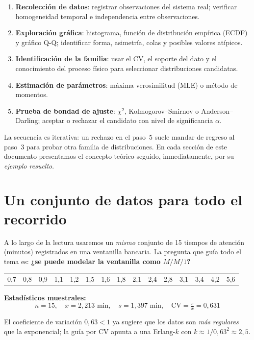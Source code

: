 \documentclass[11pt, letterpaper]{article}
\begin{document}
\begin{metodobox}
\begin{enumerate}
    \item \textbf{Recolección de datos}: registrar observaciones del sistema real; verificar homogeneidad temporal e independencia entre observaciones.
    \item \textbf{Exploración gráfica}: histograma, función de distribución empírica (ECDF) y gráfico Q-Q; identificar forma, asimetría, colas y posibles valores atípicos.
    \item \textbf{Identificación de la familia}: usar el CV, el soporte del dato y el conocimiento del proceso físico para seleccionar distribuciones candidatas.
    \item \textbf{Estimación de parámetros}: máxima verosimilitud (MLE) o método de momentos.
    \item \textbf{Prueba de bondad de ajuste}: $\chi^2$, Kolmogorov--Smirnov o Anderson--Darling; aceptar o rechazar el candidato con nivel de significancia $\alpha$.
\end{enumerate}
\end{metodobox}

La secuencia es iterativa: un rechazo en el paso~5 suele mandar de regreso al paso~3 para probar otra familia de distribuciones. En cada sección de este documento presentamos el concepto teórico seguido, inmediatamente, por su \emph{ejemplo resuelto}.

\section{Un conjunto de datos para todo el recorrido}

A lo largo de la lectura usaremos un \emph{mismo} conjunto de 15 tiempos de atención (minutos) registrados en una ventanilla bancaria. La pregunta que guía todo el tema es: \textbf{¿se puede modelar la ventanilla como $M/M/1$?}

\begin{ejemplobox}[Datos del banco pequeño ($n=15$)]
\begin{center}\small
\begin{tabular}{rrrrrrrrrrrrrrr}
0{,}7 & 0{,}8 & 0{,}9 & 1{,}1 & 1{,}2 & 1{,}5 & 1{,}6 & 1{,}8 & 2{,}1 & 2{,}4 & 2{,}8 & 3{,}1 & 3{,}4 & 4{,}2 & 5{,}6 \\
\end{tabular}
\end{center}

\textbf{Estadísticos muestrales:}
\[
n = 15, \quad \bar{x} = 2{,}213 \text{ min}, \quad s = 1{,}397 \text{ min}, \quad \mathrm{CV} = \tfrac{s}{\bar x} = 0{,}631
\]

El coeficiente de variación $0{,}63<1$ ya sugiere que los datos son \emph{más regulares} que la exponencial; la guía por CV apunta a una Erlang-$k$ con $k\approx 1/0{,}63^2 \approx 2{,}5$.
\end{ejemplobox}
\end{document}
